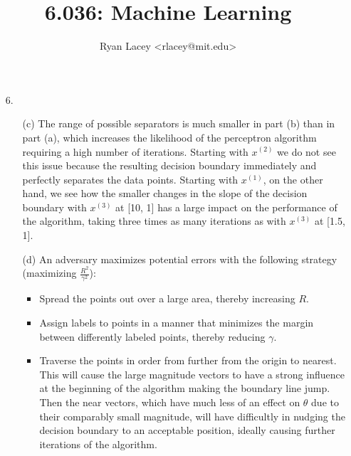 \documentclass{article}
\begin{document}

\title{6.036: Machine Learning}
\author{
  Ryan Lacey <rlacey@mit.edu>\\
}
        
\maketitle
        


\begin{enumerate}
\item[6.]
	\begin{enumerate}
	\item[(c)] 
		        The range of possible separators is much smaller in part (b) than in part (a), which increases the likelihood of the perceptron algorithm requiring a high number of iterations. Starting with $x^{(2)}$ we do not see this issue because the resulting decision boundary immediately and perfectly separates the data points. Starting with $x^{(1)}$, on the other hand, we see how the smaller changes in the slope of the decision boundary with $x^{(3)}$ at [10, 1] has a large impact on the performance of the algorithm, taking three times as many iterations as with $x^{(3)}$ at [1.5, 1].
	\item[(d)] 
		        An adversary maximizes potential errors with the following strategy (maximizing $\frac{R^2}{\gamma^2}$):
		        \begin{itemize}
		          \item Spread the points out over a large area, thereby increasing $R$.
		          \item Assign labels to points in a manner that minimizes the margin between differently labeled points, thereby reducing $\gamma$. 
		          \item Traverse the points in order from further from the origin to nearest. This will cause the large magnitude vectors to have a strong influence at the beginning of the algorithm making the boundary line jump. Then the near vectors, which have much less of an effect on $\theta$ due to their comparably small magnitude, will have difficultly in nudging the decision boundary to an acceptable position, ideally causing further iterations of the algorithm.
		        \end{itemize}
	\end{enumerate}

\bigskip


\end{enumerate}
\end{document}
